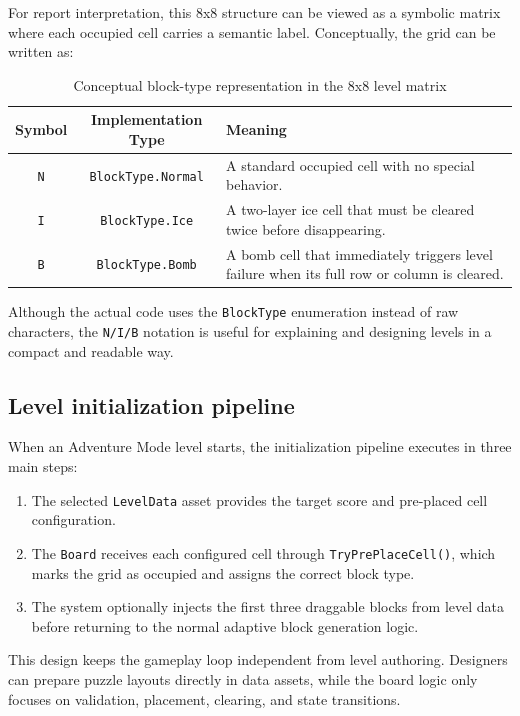 \documentclass[a4paper,12pt]{report}
\begin{document}
For report interpretation, this 8x8 structure can be viewed as a symbolic matrix where each occupied cell carries a semantic label. Conceptually, the grid can be written as:
\begin{table}[H]
\centering
\begin{tabular}{|c|c|p{8cm}|}
\hline
\textbf{Symbol} & \textbf{Implementation Type} & \textbf{Meaning} \\ \hline
\texttt{N} & \texttt{BlockType.Normal} & A standard occupied cell with no special behavior. \\ \hline
\texttt{I} & \texttt{BlockType.Ice} & A two-layer ice cell that must be cleared twice before disappearing. \\ \hline
\texttt{B} & \texttt{BlockType.Bomb} & A bomb cell that immediately triggers level failure when its full row or column is cleared. \\ \hline
\end{tabular}
\caption{Conceptual block-type representation in the 8x8 level matrix}
\label{tab:block_type_representation}
\end{table}

Although the actual code uses the \texttt{BlockType} enumeration instead of raw characters, the \texttt{N/I/B} notation is useful for explaining and designing levels in a compact and readable way.

\subsection{Level initialization pipeline}
When an Adventure Mode level starts, the initialization pipeline executes in three main steps:
\begin{enumerate}
    \item The selected \texttt{LevelData} asset provides the target score and pre-placed cell configuration.
    \item The \texttt{Board} receives each configured cell through \texttt{TryPrePlaceCell()}, which marks the grid as occupied and assigns the correct block type.
    \item The system optionally injects the first three draggable blocks from level data before returning to the normal adaptive block generation logic.
\end{enumerate}

This design keeps the gameplay loop independent from level authoring. Designers can prepare puzzle layouts directly in data assets, while the board logic only focuses on validation, placement, clearing, and state transitions.
\end{document}
